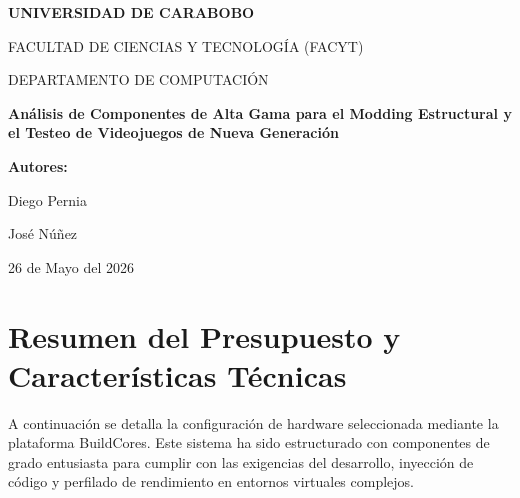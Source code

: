 \documentclass[12pt,a4paper]{article}
\begin{document}
\begin{titlepage}
    \centering
    \vspace*{1cm}
    {\large\bfseries UNIVERSIDAD DE CARABOBO \par}
    {\large FACULTAD DE CIENCIAS Y TECNOLOGÍA (FACYT) \par}
    {\large DEPARTAMENTO DE COMPUTACIÓN \par}
    \vspace{5cm}
    {\Large\bfseries Análisis de Componentes de Alta Gama para el Modding Estructural y el Testeo de Videojuegos de Nueva Generación \par}
    \vspace{9cm}
    {\large\bfseries Autores:} \\
    {\large Diego Pernia\par}
    {\large José Núñez\par}
    \vfill
    {\large 26 de Mayo del 2026 \par}
\end{titlepage}

\newpage

\section{Resumen del Presupuesto y Características Técnicas}
A continuación se detalla la configuración de hardware seleccionada mediante la plataforma BuildCores. Este sistema ha sido estructurado con componentes de grado entusiasta para cumplir con las exigencias del desarrollo, inyección de código y perfilado de rendimiento en entornos virtuales complejos.

\vspace{0.8cm}
\end{document}
